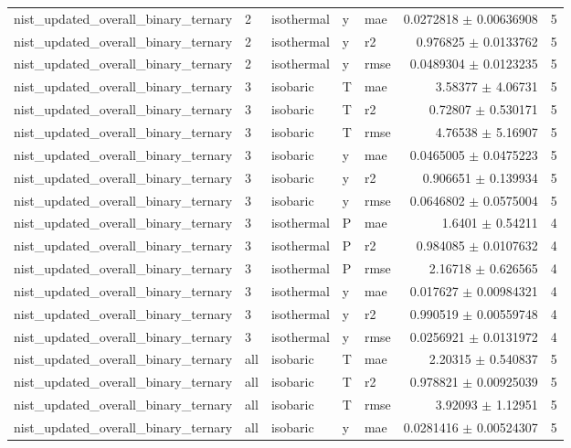 \begin{tabular}{lllllrr}
nist\_updated\_overall\_binary\_ternary & 2 & isothermal & y & mae & 0.0272818 $\pm$ 0.00636908 & 5 \\
nist\_updated\_overall\_binary\_ternary & 2 & isothermal & y & r2 & 0.976825 $\pm$ 0.0133762 & 5 \\
nist\_updated\_overall\_binary\_ternary & 2 & isothermal & y & rmse & 0.0489304 $\pm$ 0.0123235 & 5 \\
nist\_updated\_overall\_binary\_ternary & 3 & isobaric & T & mae & 3.58377 $\pm$ 4.06731 & 5 \\
nist\_updated\_overall\_binary\_ternary & 3 & isobaric & T & r2 & 0.72807 $\pm$ 0.530171 & 5 \\
nist\_updated\_overall\_binary\_ternary & 3 & isobaric & T & rmse & 4.76538 $\pm$ 5.16907 & 5 \\
nist\_updated\_overall\_binary\_ternary & 3 & isobaric & y & mae & 0.0465005 $\pm$ 0.0475223 & 5 \\
nist\_updated\_overall\_binary\_ternary & 3 & isobaric & y & r2 & 0.906651 $\pm$ 0.139934 & 5 \\
nist\_updated\_overall\_binary\_ternary & 3 & isobaric & y & rmse & 0.0646802 $\pm$ 0.0575004 & 5 \\
nist\_updated\_overall\_binary\_ternary & 3 & isothermal & P & mae & 1.6401 $\pm$ 0.54211 & 4 \\
nist\_updated\_overall\_binary\_ternary & 3 & isothermal & P & r2 & 0.984085 $\pm$ 0.0107632 & 4 \\
nist\_updated\_overall\_binary\_ternary & 3 & isothermal & P & rmse & 2.16718 $\pm$ 0.626565 & 4 \\
nist\_updated\_overall\_binary\_ternary & 3 & isothermal & y & mae & 0.017627 $\pm$ 0.00984321 & 4 \\
nist\_updated\_overall\_binary\_ternary & 3 & isothermal & y & r2 & 0.990519 $\pm$ 0.00559748 & 4 \\
nist\_updated\_overall\_binary\_ternary & 3 & isothermal & y & rmse & 0.0256921 $\pm$ 0.0131972 & 4 \\
nist\_updated\_overall\_binary\_ternary & all & isobaric & T & mae & 2.20315 $\pm$ 0.540837 & 5 \\
nist\_updated\_overall\_binary\_ternary & all & isobaric & T & r2 & 0.978821 $\pm$ 0.00925039 & 5 \\
nist\_updated\_overall\_binary\_ternary & all & isobaric & T & rmse & 3.92093 $\pm$ 1.12951 & 5 \\
nist\_updated\_overall\_binary\_ternary & all & isobaric & y & mae & 0.0281416 $\pm$ 0.00524307 & 5 \\

\end{tabular}
